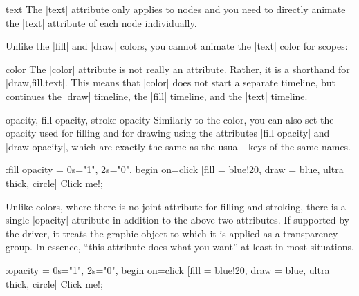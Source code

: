 \begin{tikzanimateattribute}{text}
    The |text| attribute only applies to nodes and you need to directly animate
    the |text| attribute of each node individually.
\begin{codeexample}[
    preamble={\usetikzlibrary{animations}},
    animation list={0.5,1,1.5,2},
]
\end{codeexample}
    Unlike the |fill| and |draw| colors, you cannot animate the |text| color
    for scopes:
\begin{codeexample}[
    preamble={\usetikzlibrary{animations}},
    animation list={0.5,1,1.5,2},
]
\end{codeexample}
\end{tikzanimateattribute}

\begin{tikzanimateattribute}{color}
    The |color| attribute is not really an attribute. Rather, it is a shorthand
    for |{draw,fill,text}|. This means that |color| does not start a separate
    timeline, but continues the |draw| timeline, the |fill| timeline, and the
    |text| timeline.
\end{tikzanimateattribute}

\begin{tikzanimateattribute}{opacity, fill opacity, stroke opacity}
    Similarly to the color, you can also set the opacity used for filling and
    for drawing using the attributes |fill opacity| and |draw opacity|, which
    are exactly the same as the usual \tikzname\ keys of the same names.
\begin{codeexample}[
    preamble={\usetikzlibrary{animations}},
    animation list={0.5,1,1.5,2},
]
\tikz \node :fill opacity = { 0s="1", 2s="0", begin on=click }
  [fill = blue!20, draw = blue, ultra thick, circle] {Click me!};
\end{codeexample}
    Unlike colors, where there is no joint attribute for filling and stroking,
    there is a single |opacity| attribute in addition to the above two
    attributes. If supported by the driver, it treats the graphic object to
    which it is applied as a transparency group. In essence, ``this attribute
    does what you want'' at least in most situations.
\begin{codeexample}[
    preamble={\usetikzlibrary{animations}},
    animation list={0.5,1,1.5,2},
]
\tikz \node :opacity = { 0s="1", 2s="0", begin on=click }
  [fill = blue!20, draw = blue, ultra thick, circle] {Click me!};
\end{codeexample}
\end{tikzanimateattribute}

